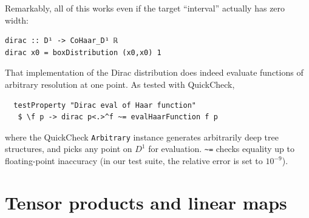 \documentclass[final,sigplan,review,anonymous]{acmart}\settopmatter{printfolios=true,printccs=false,printacmref=false}
\theoremstyle{acmplain}
\theoremstyle{acmdefinition}
\begin{document}
Remarkably, all of this works even if the target “interval” actually has zero width:
\begin{lstlisting}
dirac :: D¹ -> CoHaar_D¹ ℝ
dirac x0 = boxDistribution (x0,x0) 1
\end{lstlisting}

That implementation of the Dirac distribution does indeed evaluate functions of arbitrary resolution at one point.
As tested with QuickCheck,
\begin{lstlisting}
  testProperty "Dirac eval of Haar function"
   $ \f p -> dirac p<.>^f ~= evalHaarFunction f p
\end{lstlisting}
where the QuickCheck \lstinline`Arbitrary` instance generates arbitrarily deep tree structures, and picks any point on $D^1$ for evaluation.
\lstinline`~=` checks equality up to floating-point inaccuracy (in our test suite, the relative error  is set to $10^{-9}$).

\section{Tensor products and linear maps}
\end{document}
